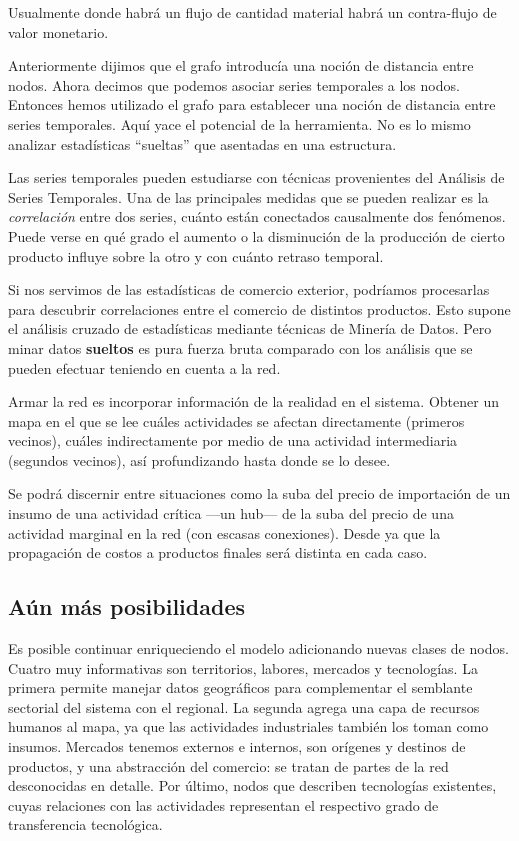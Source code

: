 \documentclass[a4paper]{report}
\begin{document}
Usualmente donde habrá un flujo de cantidad material habrá un contra-flujo de valor monetario.

Anteriormente dijimos que el grafo introducía una noción de distancia entre nodos. Ahora decimos que podemos asociar series temporales a los nodos. Entonces hemos utilizado el grafo para establecer una noción de distancia entre series temporales. Aquí yace el potencial de la herramienta. No es lo mismo analizar estadísticas ``sueltas'' que asentadas en una estructura.

Las series temporales pueden estudiarse con técnicas provenientes del Análisis de Series Temporales. Una de las principales medidas que se pueden realizar es la \textit{correlación} entre dos series, cuánto están conectados causalmente dos fenómenos. Puede verse en qué grado el aumento o la disminución de la producción de cierto producto influye sobre la otro y con cuánto retraso temporal.

Si nos servimos de las estadísticas de comercio exterior, podríamos procesarlas para descubrir correlaciones entre el comercio de distintos productos. Esto supone el análisis cruzado de estadísticas mediante técnicas de Minería de Datos. Pero minar datos \textbf{sueltos} es pura fuerza bruta comparado con los análisis que se pueden efectuar teniendo en cuenta a la red.

Armar la red es incorporar información de la realidad en el sistema. Obtener un mapa en el que se lee cuáles actividades se afectan directamente (primeros vecinos), cuáles indirectamente por medio de una actividad intermediaria (segundos vecinos), así profundizando hasta donde se lo desee.

Se podrá discernir entre situaciones como la suba del precio de importación de un insumo de una actividad crítica —un hub— de la suba del precio de una actividad marginal en la red (con escasas conexiones). Desde ya que la propagación de costos a productos finales será distinta en cada caso.

\subsection*{Aún más posibilidades}

Es posible continuar enriqueciendo el modelo adicionando nuevas clases de nodos. Cuatro muy informativas son territorios, labores, mercados y tecnologías. La primera permite manejar datos geográficos para complementar el semblante sectorial del sistema con el regional. La segunda agrega una capa de recursos humanos al mapa, ya que las actividades industriales también los toman como insumos. Mercados tenemos externos e internos, son orígenes y destinos de productos, y una abstracción del comercio: se tratan de partes de la red desconocidas en detalle. Por último, nodos que describen tecnologías existentes, cuyas relaciones con las actividades representan el respectivo grado de transferencia tecnológica.
\end{document}
